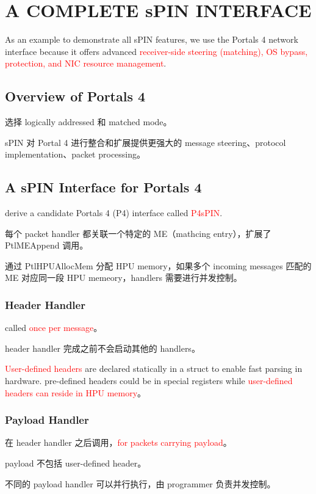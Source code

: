\documentclass[cn,pad,11pt,green,geye]{../elegantnote}
\begin{document}
\section{A COMPLETE sPIN INTERFACE}

As an example to demonstrate all sPIN features, we use the Portals 4 network interface because it offers advanced \textcolor{red}{receiver-side steering (matching), OS bypass, protection, and NIC resource management}.

\subsection{Overview of Portals 4}
 选择 logically addressed 和 matched mode。

 sPIN 对 Portal 4 进行整合和扩展提供更强大的 message steering、protocol implementation、packet processing。

\subsection{A sPIN Interface for Portals 4}
derive a candidate Portals 4 (P4) interface called \textcolor{red}{P4sPIN}.

每个 packet handler 都关联一个特定的 ME（mathcing entry），扩展了 PtlMEAppend 调用。

通过 PtlHPUAllocMem 分配 HPU memory，如果多个 incoming messages 匹配的 ME 对应同一段 HPU memeory，handlers 需要进行并发控制。

\subsubsection{Header Handler}
called \textcolor{red}{once per message}。

header handler 完成之前不会启动其他的 handlers。

\textcolor{red}{User-defined headers} are declared statically in a struct to enable fast parsing in hardware. pre-defined headers could be in special registers while \textcolor{red}{user-defined headers can reside in HPU memory}。

\subsubsection{Payload Handler}
在 header handler 之后调用，\textcolor{red}{for packets carrying payload}。

payload 不包括 user-defined header。

不同的 payload handler 可以并行执行，由 programmer 负责并发控制。
\end{document}

